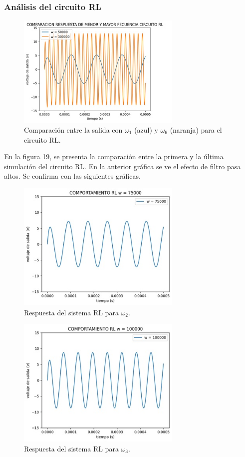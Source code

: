 \documentclass{article}
\begin{document}
\subsubsection{Análisis del circuito RL}

\begin{figure}[H]
    \centering
    \includegraphics[width=0.7\textwidth]{OMw1RL.jpg}
    \caption{Comparación entre la salida con $\omega_1$ (azul) y $\omega_6$ (naranja) para el circuito RL.}
    \label{fig:OMRL1y6}
\end{figure}
En la figura 19, se presenta la comparación entre la primera y la última simulación del circuito RL. En la anterior gráfica se ve el efecto de filtro pasa altos. Se confirma con las siguientes gráficas.
\begin{figure}[H]
    \centering
    \includegraphics[width=0.7\textwidth]{OMw2RL.jpg}
    \caption{Respuesta del sistema RL para $\omega_2$.}
\end{figure}

\begin{figure}[H]
    \centering
    \includegraphics[width=0.7\textwidth]{OMw3RL.jpg}
    \caption{Respuesta del sistema RL para $\omega_3$.}
\end{figure}
\end{document}
